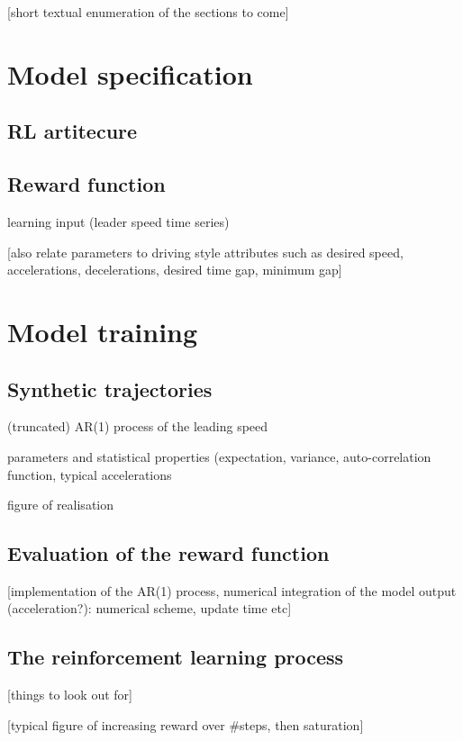 \documentclass[review]{elsarticle}
\begin{document}
[short textual enumeration of the sections to come]

\section{Model specification}

\subsection{RL artitecure}

\subsection{Reward function}

learning input (leader speed time series)

[also relate parameters to driving style attributes such as desired
speed, accelerations, decelerations, desired time gap, minimum gap]


\section{Model training}

\subsection{Synthetic trajectories}

(truncated) AR(1) process of the leading speed

parameters and statistical properties (expectation, variance, auto-correlation
function, typical accelerations

figure of realisation

\subsection{Evaluation of the reward function}

[implementation of the AR(1) process, numerical integration of the
  model output (acceleration?): numerical scheme, update time etc]

\subsection{The reinforcement learning process}

[things to look out for]

[typical figure of increasing reward over \#steps, then saturation]
\end{document}
